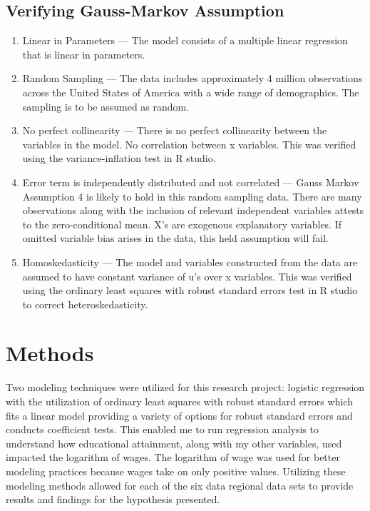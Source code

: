 \documentclass[12pt, English]{article}
\begin{document}
\subsection{Verifying Gauss-Markov Assumption}

\begin{enumerate}
    \item  Linear in Parameters — The model consists of a multiple linear regression that is linear in parameters.
    
    \item Random Sampling — The data includes approximately 4 million observations across the United States of America with a wide range of demographics. The sampling is to be assumed as random. 
    
    \item No perfect collinearity — There is no perfect collinearity between the variables in the model. No correlation between x variables. This was verified using the variance-inflation test in R studio. 
    
    \item Error term is independently distributed and not correlated — Gauss Markov Assumption 4 is likely to hold in this random sampling data. There are many observations along with the inclusion of relevant independent variables attests to the zero-conditional mean. X’s are exogenous explanatory variables. If omitted variable bias arises in the data, this held assumption will fail.
    
    \item Homoskedasticity — The model and variables constructed from the
    data are assumed to have constant variance of u’s over x variables. This was verified using the ordinary least squares with robust standard errors test in R studio to correct heteroskedasticity. 
\end{enumerate}

\section{Methods}
Two modeling techniques were utilized for this research project: logistic regression with the utilization of ordinary least squares with robust standard errors which fits a linear model providing a variety of options for robust standard errors and conducts coefficient tests. This enabled me to run regression analysis to understand how educational attainment, along with my other variables, used impacted the logarithm of wages. The logarithm of wage was used for better modeling practices because wages take on only positive values. Utilizing these modeling methods allowed for each of the six data regional data sets to provide results and findings for the hypothesis presented.  
\end{document}
